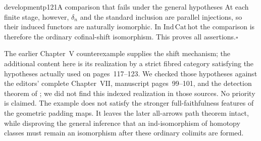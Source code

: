 \begin{dcomment}{development}{p121}{A comparison that fails under the general hypotheses}
At each finite stage, however, $\delta_n$ and the standard inclusion are parallel injections, so their induced functors are naturally isomorphic. In $\mathrm{Ind}\,\mathrm{Cat\,hot}$ the comparison is therefore the ordinary cofinal-shift isomorphism. This proves all assertions.\hfill$\square$

The earlier Chapter~V counterexample supplies the shift mechanism; the additional content here is its realization by a strict fibred category satisfying the hypotheses actually used on pages~117--123. We checked those hypotheses against the editors' complete Chapter~VII, manuscript pages~99--101, and the detection theorem of \citet{ArlinChristensen2023}; we did not find this indexed realization in those sources. No priority is claimed. The example does not satisfy the stronger full-faithfulness features of the geometric padding maps. It leaves the later all-arrows path theorem intact, while disproving the general inference that an ind-isomorphism of homotopy classes must remain an isomorphism after these ordinary colimits are formed.
\end{dcomment}




